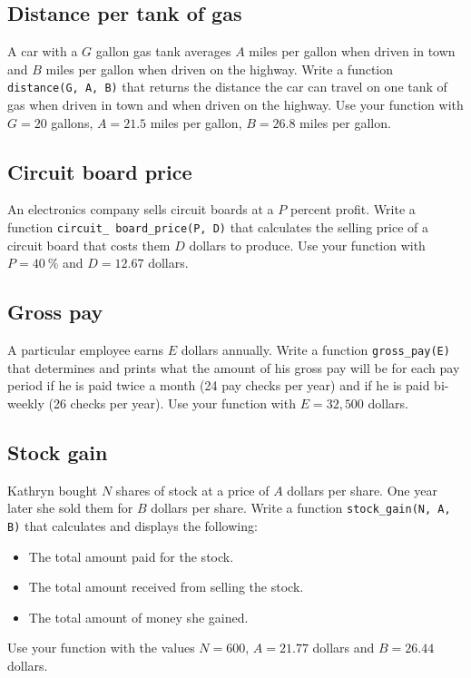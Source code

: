 
\subsection{Distance per tank of gas}

A car with a $G$ gallon gas tank averages $A$ miles per gallon 
when driven in town and 
$B$ miles per gallon when driven on the highway. Write a function {\tt distance(G, A, B)} 
that returns the distance the car can travel on one tank of gas when driven in town and when driven on the highway. 
Use your function with $G = 20$ gallons, $A = 21.5$ miles per gallon, $B = 26.8$ miles per gallon. 


\subsection{Circuit board price}

An electronics company sells circuit boards at a $P$ percent profit. 
Write a function {\tt circuit\_ board\_price(P, D)} 
that calculates the selling price of a circuit board that costs them $D$ dollars to
produce. Use your function with $P = 40\ \%$ and $D = 12.67$ dollars.


\subsection{Gross pay}

A particular employee earns $E$ dollars annually. Write a function 
{\tt gross\_pay(E)} that determines and prints what the amount of his gross pay will be for each pay period 
if he is paid twice a month (24 pay checks per year) and if he is paid bi-weekly (26 checks per 
year). Use your function with $E = 32,500$ dollars.


\subsection{Stock gain}

Kathryn bought $N$ shares of stock at a price of $A$ dollars per share. One year later she 
sold them for $B$ dollars per share. Write a function {\tt stock\_gain(N, A, B)} that calculates and 
displays the following:
\begin{itemize}
\item The total amount paid for the stock.
\item The total amount received from selling the stock.
\item The total amount of money she gained.
\end{itemize}
Use your function with the values $N = 600$, $A = 21.77$ dollars and $B = 26.44$ dollars.

